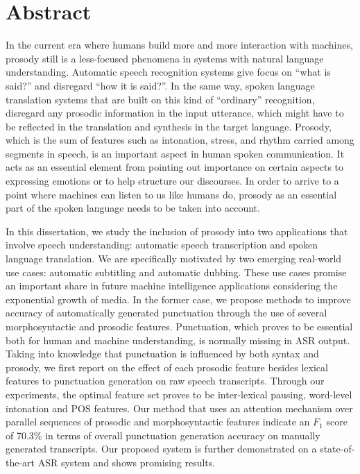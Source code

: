 \section*{\Large \sffamily Abstract}

In the current era where humans build more and more interaction with machines, prosody still is a less-focused phenomena in systems with natural language understanding. Automatic speech recognition systems give focus on ``what is said?'' and disregard ``how it is said?''. In the same way, spoken language translation systems that are built on this kind of “ordinary” recognition, disregard any prosodic information in the input utterance, which might have to be reflected in the translation and synthesis in the target language. Prosody, which is the sum of features such as intonation, stress, and rhythm carried among segments in speech, is an important aspect in human spoken communication. It acts as an essential element from pointing out importance on certain aspects to expressing emotions or to help structure our discourses. In order to arrive to a point where machines can listen to us like humans do, prosody as an essential part of the spoken language needs to be taken into account. 

In this dissertation, we study the inclusion of prosody into two applications that involve speech understanding: automatic speech transcription and spoken language translation. We are specifically motivated by two emerging real-world use cases: automatic subtitling and automatic dubbing. These use cases promise an important share in future machine intelligence applications considering the exponential growth of media. In the former case, we propose methods to improve accuracy of automatically generated punctuation through the use of several morphosyntactic and prosodic features. Punctuation, which proves to be essential both for human and machine understanding, is normally missing in ASR output. Taking into knowledge that punctuation is influenced by both syntax and prosody, we first report on the effect of each prosodic feature besides lexical features to punctuation generation on raw speech transcripts. Through our experiments, the optimal feature set proves to be inter-lexical pausing, word-level intonation and POS features. Our method that uses an attention mechanism over parallel sequences of prosodic and morphosyntactic features indicate an $F_1$ score of 70.3\% in terms of overall punctuation generation accuracy on manually generated transcripts. Our proposed system is further demonstrated on a state-of-the-art ASR system and shows promising results. 

